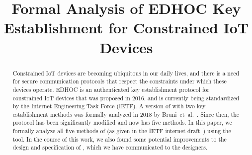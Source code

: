 \documentclass[runningheads, envcountsame, hidelinks, a4paper, draft, x11names]{llncs}
\begin{document}
\title{Formal Analysis of EDHOC Key Establishment for Constrained IoT Devices}
%
\author{}
%
%
\authorrunning{}
%
\institute{}
%
\maketitle
%


\begin{abstract}
Constrained IoT devices are becoming ubiquitous in our daily lives,
and there is a need for secure communication protocols that respect the
constraints under which these devices operate.
%
EDHOC is an authenticated key establishment protocol for constrained IoT
devices that was proposed in 2016, and is currently being standardized by the
Internet Engineering Task Force (IETF).
%
A version of \mEdhoc{} with two key establishment methods was formally analyzed
in 2018 by Bruni~et~al.~\cite{DBLP:conf/secsr/BruniJPS18}.
%
Since then, the protocol has been significantly modified and now has five methods.
%
In this paper, we formally analyze all five methods of \mEdhoc{} (as given in
the IETF internet draft~\cite{our-analysis-selander-lake-edhoc-01}) using the \mTamarin{}
tool.
%
%
In the course of this work, we also found some potential improvements to the
design and specification of \mEdhoc, which we have communicated to
the designers.
%
\end{abstract}
%
\end{document}
